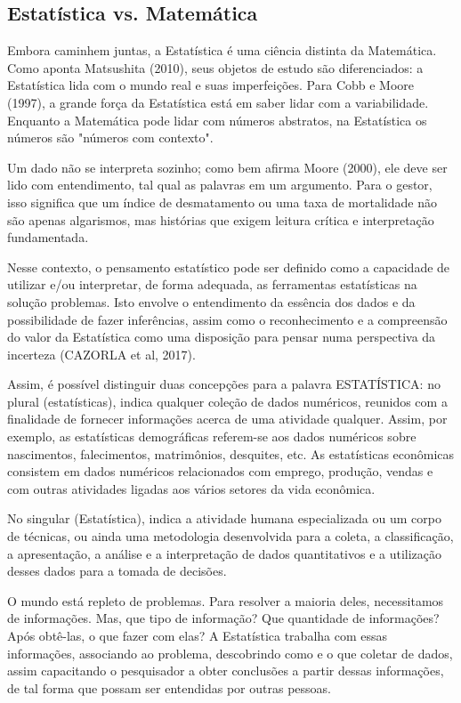 \subsection{Estatística vs. Matemática}

Embora caminhem juntas, a Estatística é uma ciência distinta da Matemática. Como aponta Matsushita (2010), seus objetos de estudo são diferenciados: a Estatística lida com o mundo real e suas imperfeições. Para Cobb e Moore (1997), a grande força da Estatística está em saber lidar com a variabilidade. Enquanto a Matemática pode lidar com números abstratos, na Estatística os números são "números com contexto".  \vskip0.3cm

Um dado não se interpreta sozinho; como bem afirma Moore (2000), ele deve ser lido com entendimento, tal qual as palavras em um argumento. Para o gestor, isso significa que um índice de desmatamento ou uma taxa de mortalidade não são apenas algarismos, mas histórias que exigem leitura crítica e interpretação fundamentada. \vskip0.3cm

Nesse contexto, o pensamento estatístico pode ser definido como a capacidade de utilizar e/ou interpretar, de forma adequada, as ferramentas estatísticas na solução problemas. Isto envolve o entendimento da essência dos dados e da possibilidade de fazer inferências, assim como o reconhecimento e a compreensão do valor da Estatística como uma disposição para pensar numa perspectiva da incerteza (CAZORLA et al, 2017). \vskip0.3cm

Assim, é possível distinguir duas concepções para a palavra ESTATÍSTICA: no plural (estatísticas), indica qualquer coleção de dados numéricos, reunidos com a finalidade de fornecer informações acerca de uma atividade qualquer. Assim, por exemplo, as estatísticas demográficas referem-se aos dados numéricos sobre nascimentos, falecimentos, matrimônios, desquites, etc. As estatísticas econômicas consistem em dados numéricos relacionados com emprego, produção, vendas e com outras atividades ligadas aos vários setores da vida econômica. \vskip0.3cm

No singular (Estatística), indica a atividade humana especializada ou um corpo de técnicas, ou ainda uma metodologia desenvolvida para a coleta, a classificação, a apresentação, a análise e a interpretação de dados quantitativos e a utilização desses dados para a tomada de decisões.\vskip0.3cm

O mundo está repleto de problemas. Para resolver a maioria deles, necessitamos de informações. Mas, que tipo de informação? Que quantidade de informações? Após obtê-las, o que fazer com elas? A Estatística trabalha com essas informações, associando ao problema, descobrindo como e o que coletar de dados, assim capacitando o pesquisador a obter conclusões a partir dessas informações, de tal forma que possam ser entendidas por outras pessoas. \vskip0.3cm


